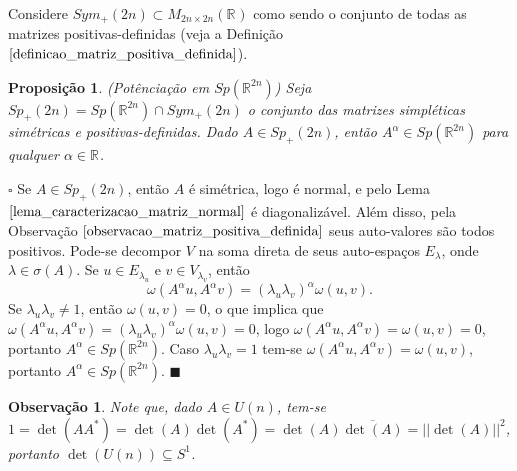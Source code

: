 \documentclass[12pt]{book}
\newtheorem{observacao}[teorema]{Observação}
\newtheorem{proposicao}[teorema]{Proposição}
\newenvironment{prova}[1]{$\square$ #1}{\hfill$\blacksquare$}
\newcommand{\espectrooperador}[1]{\sigma(#1)}
\newcommand{\gruposimpletico}[1]{Sp(#1)}
\newcommand{\gruposimpleticopositivo}[1]{Sp_{+}(#1)}
\newcommand{\matrizquadreal}[1]{M_{#1 \times #1}(\real{})}
\newcommand{\matrizsimetricapositiva}[1]{Sym_{+}(#1)}
\newcommand{\matrizunitaria}[1]{U(#1)}
\newcommand{\real}[1]{\mathbb{R}^{#1}}
\begin{document}
	Considere $\matrizsimetricapositiva{2n} \subset \matrizquadreal{2n}$ como sendo o conjunto de todas as matrizes positivas-definidas (veja a Definição $\ref{definicao_matriz_positiva_definida}$).
	
	\begin{proposicao}\label{proposicao_potenciacao_grupo_simpletico}
		(Potênciação em $\gruposimpletico{\real{2n}}$) Seja $\gruposimpleticopositivo{2n} = \gruposimpletico{\real{2n}} \cap \matrizsimetricapositiva{2n}$ o conjunto das matrizes simpléticas simétricas e positivas-definidas. Dado $A \in \gruposimpleticopositivo{2n}$, então $A^{\alpha} \in \gruposimpletico{\real{2n}}$ para qualquer $\alpha \in \real{}$.
	\end{proposicao}
	\begin{prova}
		Se $A \in \gruposimpleticopositivo{2n}$, então $A$ é simétrica, logo é normal, e pelo Lema $\ref{lema_caracterizacao_matriz_normal}$ é diagonalizável. Além disso, pela Observação $\ref{observacao_matriz_positiva_definida}$ seus auto-valores são todos positivos. Pode-se decompor $V$ na soma direta de seus auto-espaços $E_{\lambda}$, onde $\lambda \in \espectrooperador{A}$. Se $u \in E_{\lambda_{u}}$ e $v \in V_{\lambda_{v}}$, então
		$$
		\omega(A^{\alpha}u,A^{\alpha}v) = 		(\lambda_{u}\lambda_{v})^{\alpha}\omega(u,v).
		$$
		Se $\lambda_{u}\lambda_{v}\neq 1$, então $\omega(u,v)=0$, o que implica que $\omega(A^{\alpha}u,A^{\alpha}v)=(\lambda_{u}\lambda_{v})^{\alpha}\omega(u,v)=0$, logo $\omega(A^{\alpha}u,A^{\alpha}v) = \omega(u,v)=0$, portanto $A^{\alpha} \in \gruposimpletico{\real{2n}}$. Caso $\lambda_{u}\lambda_{v}=1$ tem-se $\omega(A^{\alpha}u,A^{\alpha}v) = \omega(u,v)$, portanto $A^{\alpha} \in \gruposimpletico{\real{2n}}$.
	\end{prova}
	
	\begin{observacao}\label{observacao_determinante_matriz_unitaria}
		Note que, dado $A \in \matrizunitaria{n}$, tem-se $1= \det(AA^{*}) = \det(A)\det(A^{*}) = \det(A)\overline{\det(A)} = ||\det(A)||^{2}$, portanto $\det(\matrizunitaria{n}) \subseteq S^{1}$.
	\end{observacao}
	
\end{document}
